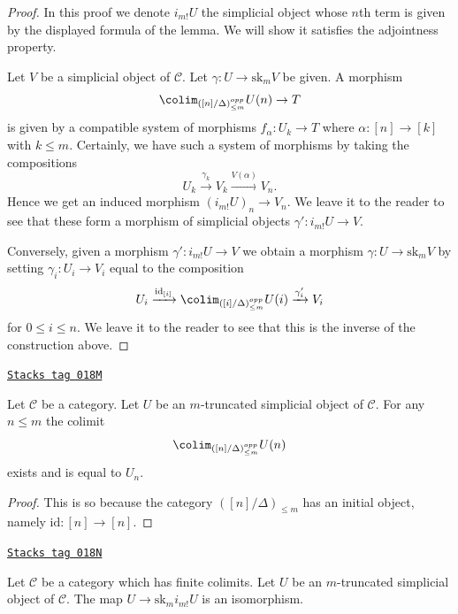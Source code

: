 \begin{proof}
In this proof we denote $i_{m!}U$ the simplicial object
whose $n$th term is given by the displayed formula of the
lemma. We will show it satisfies the adjointness property.

\medskip\noindent
Let $V$ be a simplicial object of $\mathcal{C}$.
Let $\gamma : U \to \text{sk}_mV$ be given.
A morphism
$$
\colim_{([n]/\Delta)_{\leq m}^{opp}} U(n) \to T
$$
is given by a compatible system of morphisms
$f_\alpha : U_k \to T$ where $\alpha : [n] \to [k]$
with $k \leq m$. Certainly, we have such a system of
morphisms by taking the compositions
$$
U_k \xrightarrow{\gamma_k} V_k \xrightarrow{V(\alpha)} V_n.
$$
Hence we get an induced morphism $(i_{m!}U)_n \to V_n$.
We leave it to the reader to see that these form a
morphism of simplicial objects $\gamma' : i_{m!}U \to V$.

\medskip\noindent
Conversely, given a morphism $\gamma' : i_{m!}U \to V$ we obtain
a morphism $\gamma : U \to \text{sk}_m V$ by setting
$\gamma_i : U_i \to V_i$ equal to the composition
$$
U_i
\xrightarrow{\text{id}_{[i]}}
\colim_{([i]/\Delta)_{\leq m}^{opp}} U(i)
\xrightarrow{\gamma'_i}
V_i
$$
for $0 \leq i \leq n$. We leave it to the reader to see that
this is the inverse of the construction above.
\end{proof}

\begin{lemma}[Recovering U]
\label{simplicial-lemma-recovering-U}
\href{https://stacks.math.columbia.edu/tag/018M}{\texttt{Stacks tag 018M}}

Let $\mathcal{C}$ be a category.
Let $U$ be an $m$-truncated simplicial object of $\mathcal{C}$.
For any $n \leq m$ the colimit
$$
\colim_{([n]/\Delta)_{\leq m}^{opp}} U(n)
$$
exists and is equal to $U_n$.
\end{lemma}

\begin{proof}
This is so because the category $([n]/\Delta)_{\leq m}$
has an initial object, namely $\text{id} : [n] \to [n]$.
\end{proof}

\begin{lemma}
\label{simplicial-lemma-recovering-U-for-real}
\href{https://stacks.math.columbia.edu/tag/018N}{\texttt{Stacks tag 018N}}

Let $\mathcal{C}$ be a category which has finite colimits.
Let $U$ be an $m$-truncated simplicial object of $\mathcal{C}$.
The map $U \to \text{sk}_m i_{m!}U$ is an isomorphism.
\end{lemma}

